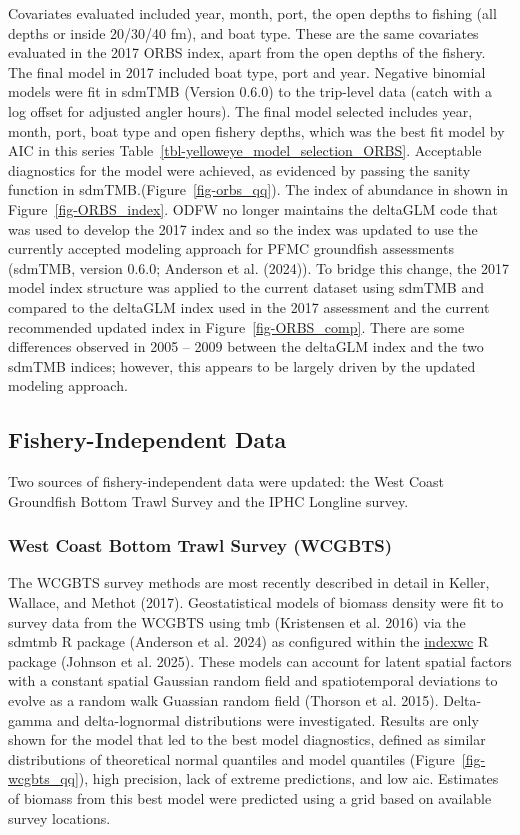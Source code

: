 \documentclass[
]{scrartcl}
\begin{document}
Covariates evaluated included year, month, port, the open depths to
fishing (all depths or inside 20/30/40 fm), and boat type. These are the
same covariates evaluated in the 2017 ORBS index, apart from the open
depths of the fishery. The final model in 2017 included boat type, port
and year. Negative binomial models were fit in sdmTMB (Version 0.6.0) to
the trip-level data (catch with a log offset for adjusted angler hours).
The final model selected includes year, month, port, boat type and open
fishery depths, which was the best fit model by AIC in this series
Table~\ref{tbl-yelloweye_model_selection_ORBS}. Acceptable diagnostics
for the model were achieved, as evidenced by passing the sanity function
in sdmTMB.(Figure~\ref{fig-orbs_qq}). The index of abundance in shown in
Figure~\ref{fig-ORBS_index}. ODFW no longer maintains the deltaGLM code
that was used to develop the 2017 index and so the index was updated to
use the currently accepted modeling approach for PFMC groundfish
assessments (sdmTMB, version 0.6.0; Anderson et al. (2024)). To bridge
this change, the 2017 model index structure was applied to the current
dataset using sdmTMB and compared to the deltaGLM index used in the 2017
assessment and the current recommended updated index in
Figure~\ref{fig-ORBS_comp}. There are some differences observed in 2005
-- 2009 between the deltaGLM index and the two sdmTMB indices; however,
this appears to be largely driven by the updated modeling approach.

\subsection{Fishery-Independent Data}\label{fishery-independent-data}

Two sources of fishery-independent data were updated: the West Coast
Groundfish Bottom Trawl Survey and the IPHC Longline survey.

\subsubsection{West Coast Bottom Trawl Survey
(WCGBTS)}\label{west-coast-bottom-trawl-survey-wcgbts}

The WCGBTS survey methods are most recently described in detail in
Keller, Wallace, and Methot (2017). Geostatistical models of biomass
density were fit to survey data from the WCGBTS using \gls{tmb}
(Kristensen et al. 2016) via the \gls{sdmtmb} R package (Anderson et al.
2024) as configured within the
\href{https://github.com/pfmc-assessments/indexwc}{indexwc} R package
(Johnson et al. 2025). These models can account for latent spatial
factors with a constant spatial Gaussian random field and spatiotemporal
deviations to evolve as a random walk Guassian random field (Thorson et
al. 2015). Delta-gamma and delta-lognormal distributions were
investigated. Results are only shown for the model that led to the best
model diagnostics, defined as similar distributions of theoretical
normal quantiles and model quantiles (Figure~\ref{fig-wcgbts_qq}), high
precision, lack of extreme predictions, and low \gls{aic}. Estimates of
biomass from this best model were predicted using a grid based on
available survey locations.
\end{document}
